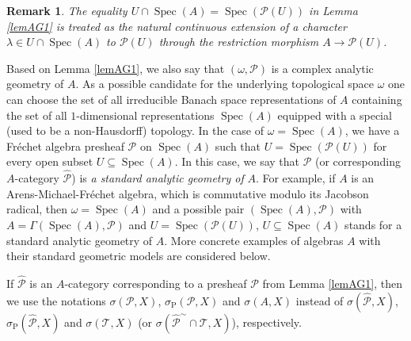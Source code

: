 \documentclass[12pt]{amsart}%
\theoremstyle{plain}
\newtheorem{remark}{Remark}
\numberwithin{equation}{section}
\numberwithin{equation}{section}
\numberwithin{theorem}{section}
\numberwithin{lemma}{section}
\numberwithin{remark}{section}
\numberwithin{example}{section}
\numberwithin{proposition}{section}
\numberwithin{definition}{section}
\numberwithin{corollary}{section}
\begin{document}
\begin{remark}
\label{remAG1}The equality $U\cap\operatorname{Spec}\left(  A\right)
=\operatorname{Spec}\left(  \mathcal{P}\left(  U\right)  \right)  $ in Lemma
\ref{lemAG1} is treated as the natural continuous extension of a character
$\lambda\in U\cap\operatorname{Spec}\left(  A\right)  $ to $\mathcal{P}\left(
U\right)  $ through the restriction morphism $A\rightarrow\mathcal{P}\left(
U\right)  $.
\end{remark}

Based on Lemma \ref{lemAG1}, we also say that $\left(  \omega,\mathcal{P}%
\right)  $ is a complex analytic geometry of $A$. As a possible candidate for
the underlying topological space $\omega$ one can choose the set of all
irreducible Banach space representations of $A$ containing the set of all
$1$-dimensional representations $\operatorname{Spec}\left(  A\right)  $
equipped with a special (used to be a non-Hausdorff) topology. In the case of
$\omega=\operatorname{Spec}\left(  A\right)  $, we have a Fr\'{e}chet algebra
presheaf $\mathcal{P}$ on $\operatorname{Spec}\left(  A\right)  $ such that
$U=\operatorname{Spec}\left(  \mathcal{P}\left(  U\right)  \right)  $ for
every open subset $U\subseteq\operatorname{Spec}\left(  A\right)  $. In this
case, we say that $\mathcal{P}$ (or corresponding $A$-category
$\widehat{\mathcal{P}}$) is \textit{a standard analytic geometry of }$A$. For
example, if $A$ is an Arens-Michael-Fr\'{e}chet algebra, which is commutative
modulo its Jacobson radical, then $\omega=\operatorname{Spec}\left(  A\right)
$ and a possible pair $\left(  \operatorname{Spec}\left(  A\right)
,\mathcal{P}\right)  $ with $A=\Gamma\left(  \operatorname{Spec}\left(
A\right)  ,\mathcal{P}\right)  $ and $U=\operatorname{Spec}\left(
\mathcal{P}\left(  U\right)  \right)  $, $U\subseteq\operatorname{Spec}\left(
A\right)  $ stands for a standard analytic geometry of $A$. More concrete
examples of algebras $A$ with their standard geometric models are considered below.

If $\widehat{\mathcal{P}}$ is an $A$-category corresponding to a presheaf
$\mathcal{P}$ from Lemma \ref{lemAG1}, then we use the notations
$\sigma\left(  \mathcal{P},X\right)  $, $\sigma_{\operatorname{P}}\left(
\mathcal{P},X\right)  $ and $\sigma\left(  A,X\right)  $ instead of
$\sigma\left(  \widehat{\mathcal{P}},X\right)  $, $\sigma_{\operatorname{P}%
}\left(  \widehat{\mathcal{P}},X\right)  $ and $\sigma\left(  \mathcal{T}%
,X\right)  $ (or $\sigma\left(  \widehat{\mathcal{P}}^{\sim}\cap
\mathcal{T},X\right)  $), respectively.
\end{document}
